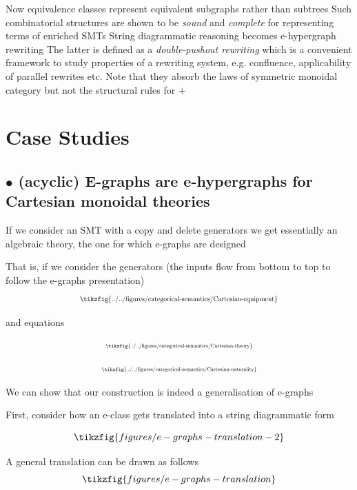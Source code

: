 \documentclass[aspectratio=169]{beamer}
\newcommand{\bsubsection}[1]{\subsection{$\bullet$ #1}}
\begin{document}
\begin{frame}{}
    \vfill
    Now equivalence classes represent equivalent subgraphs rather than subtrees
    \pause
    \vfill
    \pause
    Such combinatorial structures are shown to be \textit{sound} and \textit{complete} for representing terms of enriched SMTs
    \vfill
    \pause
    String diagrammatic reasoning becomes e-hypergraph rewriting
    \vfill
    \pause
    The latter is defined as a \textit{double-pushout rewriting} which is a convenient framework to study properties of a rewriting system, e.g. confluence, applicability of parallel rewrites etc.
    \vfill
    \pause
    Note that they absorb the laws of symmetric monoidal category but not the structural rules for $+$
\end{frame}

\section{Case Studies}

\bsubsection{(acyclic) E-graphs are e-hypergraphs for Cartesian monoidal theories}

\begin{frame}{}
    If we consider an SMT with a copy and delete generators we get essentially an algebraic theory, the one for which e-graphs are designed

    That is, if we consider the generators (the inputs flow from bottom to top to follow the e-graphs presentation)
    \[
	\scalebox{0.7}{
  	 \tikzfig{../../figures/categorical-semantics/Cartesian-equipment}
	}
    \]

    and equations

    \begin{minipage}{0.4\linewidth}
        \[
            \scalebox{0.55}{
            \tikzfig{../../figures/categorical-semantics/Cartesian-theory}	
            }
            \]
    \end{minipage}
    \hfill
    \begin{minipage}{0.5\linewidth}
        \[
            \scalebox{0.55}{
            \tikzfig{../../figures/categorical-semantics/Cartesian-naturality}
            }
        \]
    \end{minipage}


    We can show that our construction is indeed a generalisation of e-graphs
\end{frame}

\begin{frame}{}
    First, consider how an e-class gets translated into a string diagrammatic form

    \begin{example}
    \[
    \tikzfig{figures/e-graphs-translation-2}
    \]
    \end{example}

    A general translation can be drawn as follows
    \[
    \tikzfig{figures/e-graphs-translation}
    \]
\end{frame}
\end{document}
